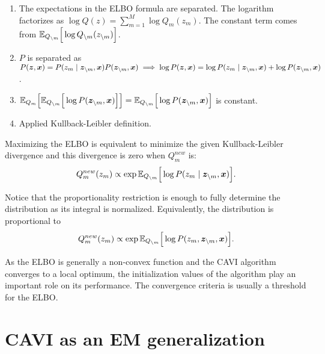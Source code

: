 \begin{enumerate}
  \item The expectations in the ELBO formula are separated. The logarithm factorizes as \(\log Q(z) = \sum_{m=1}^M \log Q_m(z_m)\).  The constant term comes from \( \mathbb{E}_{Q_{\backslash m}}\Big[\log Q_{\backslash m}(z_{\backslash m})\Big] \).
  \item \( P \) is separated as \( P(\bm{z}, \bm{x}) = P(z_m \mid \bm{z}_{\backslash m}, \bm{x})P(\bm{z}_{\backslash m}, \bm{x}) \implies \log P(\bm{z}, \bm{x}) = \log P(z_m \mid \bm{z}_{\backslash m}, \bm{x}) + \log P(\bm{z}_{\backslash m}, \bm{x})\).
  \item \( \mathbb{E}_{Q_{m}}\Big[\mathbb{E}_{Q_{\backslash m}}\Big[\log{P(\bm{z}_{\backslash m}, \bm{x})}\Big]\Big] = \mathbb{E}_{Q_{\backslash m}}\Big[\log{P(\bm{z}_{\backslash m}, \bm{x})}\Big]\) is constant.
  \item Applied Kullback-Leibler definition.
\end{enumerate}

Maximizing the ELBO is equivalent to minimize the given Kullback-Leibler divergence and this divergence is zero when \(Q_{m}^{new}\) is:
\[
  Q_{m}^{new}(z_{m}) \propto \exp{\mathbb{E}_{Q_{\backslash m}}\Big[\log{P(z_{m} \mid \bm{z}_{\backslash m}, \bm{x})}\Big]}.
\]

Notice that the proportionality restriction is enough to fully determine the distribution as its integral is normalized. Equivalently, the distribution is proportional to
\begin{equation}\label{eq:cavi_update}
    Q_{m}^{new}(z_{m}) \propto \exp{\mathbb{E}_{Q_{\backslash m}}\Big[\log{P(z_{m}, \bm{z}_{\backslash m}, \bm{x})}\Big]}.
\end{equation}

As the ELBO is generally a non-convex function and the CAVI algorithm converges to a local optimum, the initialization values of the algorithm play an important role on its performance. The convergence criteria is usually a threshold for the ELBO.

\section{CAVI as an EM generalization}

